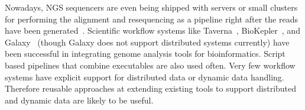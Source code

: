 Nowadays, NGS sequencers are even being shipped with servers or small
clusters for performing the alignment and resequencing as a pipeline
right after the reads have been generated~\cite{ilm}.
%
Scientific workflow systems like Taverna~\cite{Taverna:2006}, BioKepler~\cite{biokepler:2011}, and
Galaxy~\cite{galaxy} (though Galaxy does not support distributed systems currently) have been successful in integrating genome
analysis tools for bioinformatics. Script based pipelines that combine
executables are also used often. Very few workflow systems have
explicit support for distributed data or dynamic data handling.
Therefore reusable approaches at extending existing tools to support
distributed and dynamic data are likely to be useful.


%









